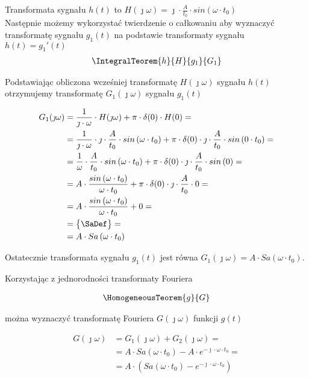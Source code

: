 \begin{task}
Transformata sygnału $h(t)$ to $H(\jmath \omega)=\jmath \cdot \frac{A}{t_0} \cdot sin\left( \omega \cdot t_0\right)$
\\

Następnie możemy wykorzystać twierdzenie o całkowaniu aby wyznaczyć transformatę sygnału $g_1(t)$ na podstawie transformaty sygnału $h(t)=g_1'(t)$
\begin{align*}
\IntegralTeorem{h}{H}{g_1}{G_1}
\end{align*}

Podstawiając obliczona wcześniej transformatę $H(\jmath \omega)$ sygnału $h(t)$ otrzymujemy transformatę $G_1(\jmath \omega)$ sygnału $g_1(t)$

\begin{align*}
G_1(\jmath \omega) &= \frac{1}{\jmath \cdot \omega} \cdot H(\jmath \omega) + \pi \cdot \delta(0) \cdot H(0)=\\
&=\frac{1}{\jmath \cdot \omega} \cdot \jmath \cdot \frac{A}{t_0} \cdot sin\left( \omega \cdot t_0\right) + \pi \cdot \delta(0) \cdot \jmath \cdot \frac{A}{t_0} \cdot sin\left( 0 \cdot t_0\right)=\\
&=\frac{1}{\omega} \cdot \frac{A}{t_0}\cdot sin\left( \omega \cdot t_0\right) + \pi \cdot \delta(0) \cdot \jmath \cdot \frac{A}{t_0} \cdot sin\left( 0\right)=\\
&= A \cdot \frac{sin\left( \omega \cdot t_0\right)}{\omega \cdot t_0} + \pi \cdot \delta(0) \cdot \jmath \cdot \frac{A}{t_0} \cdot 0=\\
&= A \cdot \frac{sin\left( \omega \cdot t_0\right)}{\omega \cdot t_0} + 0=\\
&=\begin{Bmatrix}
\SaDef
\end{Bmatrix}=\\
&=A \cdot Sa\left( \omega \cdot t_0\right)
\end{align*}

Ostatecznie transformata sygnału $g_1(t)$ jest równa $G_1(\jmath \omega)=A \cdot Sa\left( \omega \cdot t_0\right)$.

Korzystając z jednorodności transformaty Fouriera 

\begin{align*}
\HomogeneousTeorem{g}{G}
\end{align*}

można wyznaczyć transformatę Fouriera $G(\jmath \omega)$ funkcji $g(t)$

\begin{align*}
G(\jmath \omega) &= G_1(\jmath \omega)+G_2(\jmath \omega)=\\
&= A \cdot Sa\left( \omega \cdot t_0\right) -A \cdot e^{-\jmath \cdot \omega \cdot t_0}=\\
&= A \cdot \left( Sa\left( \omega \cdot t_0\right) - e^{-\jmath \cdot \omega \cdot t_0} \right)
\end{align*}


\end{task}
